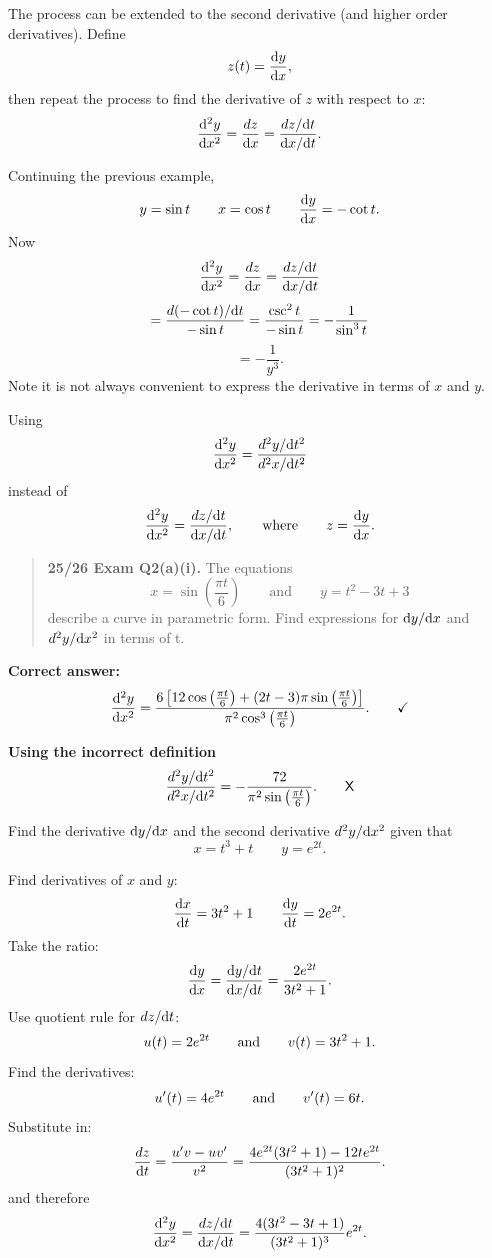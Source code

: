 The process can be extended to the second derivative (and higher order derivatives). Define
\[
z(t)=\frac{{\rm d} y}{{\rm d} x},
\]
then repeat the process to find the derivative of $z$ with respect to $x$:
\[
\frac{{\rm d} ^2y}{{\rm d} x^2}=\frac{dz}{{\rm d}x}=\frac{dz/{\rm d}t}{{\rm d}x/{\rm d}t}.
\]

Continuing the previous example,
\[
y=\sin t \qquad x=\cos t \qquad \frac{{\rm d} y}{{\rm d} x}=-\cot t.
\]
Now
\[
\frac{{\rm d} ^2y}{{\rm d} x^2}=\frac{dz}{{\rm d}x}=\frac{dz/{\rm d}t}{{\rm d}x/{\rm d}t}
\]
\[
=\frac{d(-\cot t)/{\rm d}t}{-\sin t}=\frac{\csc^2t}{-\sin t}=-\frac{1}{\sin^3t}
\]
\[
=-\frac{1}{y^3}.
\]
Note it is not always convenient to express the derivative in terms of $x$ and $y$.

\newtexpage
\begin{exammistake}
Using
\[
\frac{{\rm d} ^2y}{{\rm d} x^2}=\frac{d^2y/{\rm d}t^2}{d^2x/{\rm d}t^2}
\]
instead of
\[
\frac{{\rm d} ^2y}{{\rm d} x^2}=\frac{dz/{\rm d}t}{{\rm d}x/{\rm d}t}, \qquad \text{where} \qquad z=\frac{{\rm d} y}{{\rm d} x}.
\]

\begin{quote}
\textbf{25/26 Exam Q2(a)(i).} The equations
\[
x=\sin\left(\frac{\pi t}{6}\right)
\qquad\text{and}\qquad
y=t^2-3t+3
\]
describe a curve in parametric form. Find expressions for ${\rm d}y/{\rm d}x$ and $d^2y/{\rm d}x^2$ in terms of t.
\end{quote}

\textbf{Correct answer:}
\[
\frac{{\rm d} ^2y}{{\rm d} x^2}
=
\frac{6\left[12\cos\left(\frac{\pi t}{6}\right)+(2t-3)\pi\sin\left(\frac{\pi t}{6}\right)\right]}
{\pi^2\cos^3\left(\frac{\pi t}{6}\right)}. \qquad \checkmark
\]

\textbf{Using the incorrect definition}
\[
\frac{d^2y/{\rm d}t^2}{d^2x/{\rm d}t^2}=-\frac{72}{\pi^2\sin\left(\frac{\pi t}{6}\right)}. \qquad \text{\sffamily X}
\]
\end{exammistake}

\goodbreak
\begin{example}[Lecture]
Find the derivative ${\rm d}y/{\rm d}x$ and the second derivative $d^2y/{\rm d}x^2$ given that
\[
x=t^3+t \qquad y=e^{2t}.
\]
\end{example}
%
\begin{solution}
Find derivatives of $x$ and $y$:
\[
\frac{{\rm d} x}{{\rm d} t}=3t^2+1
\qquad
\frac{{\rm d} y}{{\rm d} t}=2e^{2t}.
\]
Take the ratio:
\[
\frac{{\rm d} y}{{\rm d} x}=\frac{{\rm d}y/{\rm d}t}{{\rm d}x/{\rm d}t}=\frac{2e^{2t}}{3t^2+1}.
\]
Use quotient rule for $dz/{\rm d}t$:
\[
u(t)=2e^{2t}
\qquad\text{and}\qquad
v(t)=3t^2+1.
\]
Find the derivatives:
\[
u'(t)=4e^{2t}
\qquad\text{and}\qquad
v'(t)=6t.
\]
Substitute in:
\[
\frac{dz}{{\rm d}t}=\frac{u'v-uv'}{v^2}
=\frac{4e^{2t}(3t^2+1)-12te^{2t}}{(3t^2+1)^2}.
\]
and therefore
\[
\frac{{\rm d} ^2y}{{\rm d} x^2}=\frac{dz/{\rm d}t}{{\rm d}x/{\rm d}t}
=\frac{4(3t^2-3t+1)}{(3t^2+1)^3}e^{2t}.
\]
\end{solution}

